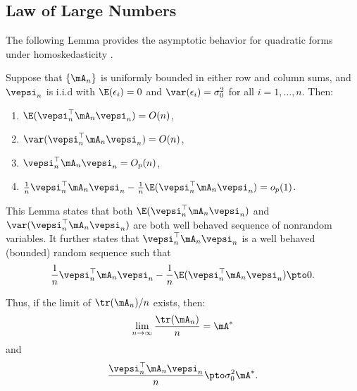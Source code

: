 \documentclass[english,12pt]{book}\usepackage[]{graphicx}\usepackage[]{xcolor}
\begin{document}
\subsection{Law of Large Numbers}

The following Lemma provides the asymptotic behavior for quadratic forms under homoskedasticity \citep[see for example Lemma 2 in][]{kelejian1999generalized}.
\begin{lemma}\label{lemma:O-lemma-lee}
Suppose that  $\left\lbrace \mA_n\right\rbrace$ is uniformly bounded in either row and column sums, and $\vepsi_n$ is i.i.d with $\E(\epsilon_i) = 0$ and $\var(\epsilon_i) = \sigma_0^2$ for all $i = 1, \ldots, n$. Then:
\begin{enumerate}
  \item $\E(\vepsi_n^\top\mA_n\vepsi_n) = O(n)$,
  \item $\var(\vepsi_n^\top\mA_n\vepsi_n) = O(n)$,
  \item $\vepsi_n^\top\mA_n\vepsi_n = O_p(n)$,
  \item $\frac{1}{n}\vepsi_n^\top\mA_n\vepsi_n - \frac{1}{n}\E(\vepsi_n^\top\mA_n\vepsi_n) = o_p(1)$.
\end{enumerate}
\end{lemma}

This Lemma states that both $\E(\vepsi_n^\top\mA_n\vepsi_n)$ and $\var(\vepsi_n^\top\mA_n\vepsi_n)$ are both well behaved sequence of nonrandom variables. It further states that $\vepsi_n^\top\mA_n\vepsi_n$ is a well behaved (bounded) random sequence such that
\begin{equation*}
\frac{1}{n}\vepsi_n^\top\mA_n\vepsi_n - \frac{1}{n}\E(\vepsi_n^\top\mA_n\vepsi_n)\pto 0.
\end{equation*}

Thus, if the limit of $\tr(\mA_n)/n$ exists, then:
\begin{equation*}
\lim_{n\to\infty}\frac{\tr(\mA_n)}{n} = \mA^*
\end{equation*}
%
and
\begin{equation*}
  \frac{\vepsi_n^\top \mA_n \vepsi_n}{n}\pto \sigma^2_0\mA^*.
\end{equation*}
\end{document}
